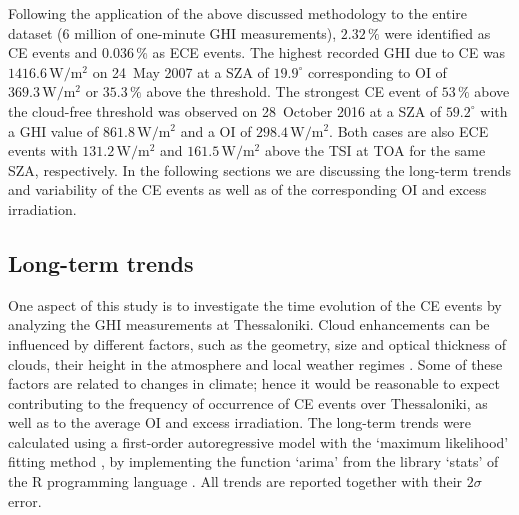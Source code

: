 \documentclass[preprint, 5p,
authoryear]{elsarticle} %
\begin{document}
Following the application of the above discussed methodology to the
entire dataset (\(6\) million of one-minute GHI measurements),
\(2.32\,\%\) were identified as CE events and \(0.036\,\%\) as ECE
events. The highest recorded GHI due to CE was
\(1416.6\,\text{W}/\text{m}^2\) on 24~May 2007 at a SZA of
\(19.9^\circ\) corresponding to OI of \(369.3\,\text{W}/\text{m}^2\) or
\(35.3\,\%\) above the threshold. The strongest CE event of \(53\,\%\)
above the cloud-free threshold was observed on 28~October 2016 at a SZA
of \(59.2^\circ\) with a GHI value of \(861.8\,\text{W}/\text{m}^2\) and
a OI of \(298.4\,\text{W}/\text{m}^2\). Both cases are also ECE events
with \(131.2\,\text{W}/\text{m}^2\) and \(161.5\,\text{W}/\text{m}^2\)
above the TSI at TOA for the same SZA, respectively. In the following
sections we are discussing the long-term trends and variability of the
CE events as well as of the corresponding OI and excess irradiation.

\hypertarget{long-term-trends}{%
\subsection{Long-term trends}\label{long-term-trends}}

One aspect of this study is to investigate the time evolution of the CE
events by analyzing the GHI measurements at Thessaloniki. Cloud
enhancements can be influenced by different factors, such as the
geometry, size and optical thickness of clouds, their height in the
atmosphere and local weather regimes
\citep{Mol2023, Veerman2022, Gristey2022, Tzoumanikas2016}. Some of
these factors are related to changes in climate; hence it would be
reasonable to expect contributing to the frequency of occurrence of CE
events over Thessaloniki, as well as to the average OI and excess
irradiation. The long-term trends were calculated using a first-order
autoregressive model with the `maximum likelihood' fitting method
\citep{Gardner1980, Jones1980}, by implementing the function `arima'
from the library `stats' of the R programming language \citep{RCT2023}.
All trends are reported together with their \(2\sigma\) error.
\end{document}
